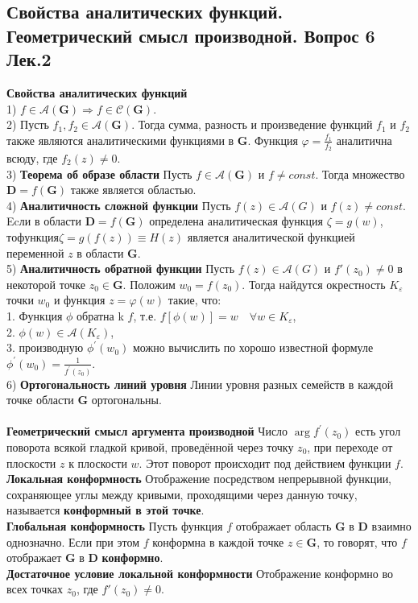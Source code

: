 \documentclass{article}
\begin{document}
\subsection{Свойства аналитических функций. Геометрический смысл производной. Вопрос 6 Лек.2}
	\textbf{Свойства аналитических функций}\\
	1) $ f \in \mathcal{A}(\mathbf{G}) \Rightarrow f \in \mathcal{C}(\mathbf{G})$.\\
	2) Пусть $ f_{1}, f_{2} \in \mathcal{A}(\mathbf{G}) $. Тогда сумма, разность и произведение функций $ f_{1} $ и $ f_{2} $ также являются аналитическими функциями в $\mathbf{G}$. Функция $\varphi=\frac{f_{1}}{f_{2}}$ аналитична всюду, где $ f_{2}(z) \neq 0$.\\
	3) \textbf{Теорема об образе области} Пусть $ f \in \mathcal{A}(\mathbf{G})$ и $f\ne const$. Тогда множество $\mathbf{D}=f(\mathbf{G})$ также является областью.\\
	4) \textbf{Аналитичность сложной функции} Пусть $ f(z) \in \mathcal{A}(  G  ) $ и $f(z) \neq  const$. Ecли в области $ \mathbf{D}=f(\mathbf{G}) $ определена аналитическая функция $ \zeta=g(w)$, $ то функция  \zeta=g(f(z)) \equiv H(z) $ является аналитической функцией переменной $z$ в области $\mathbf{G}$.\\
	5) \textbf{Аналитичность обратной функции} Пусть $ f(z) \in \mathcal{A}(  G  ) $ и $f'({z}_{0}) \neq  0$ в некоторой точке ${z}_{0}\in \mathbf{G}$. Положим $ w_{0}=f\left(z_{0}\right) $. Тогда найдутся окрестность $ K_{\varepsilon} $ точки $ w_{0} $ и функция $ z=\varphi(w) $ такие, что:\\
	1. Функция $ \phi $ обратна k $f$, т.е. $f[\phi(w)]=w \quad \forall w \in K_{\varepsilon}$,\\
	2. $\phi(w) \in \mathcal{A}\left(K_{\varepsilon}\right)$,\\ 
	3. производную $ \phi^{\prime}\left(w_{0}\right) $ можно вычислить по хорошо известной формуле $\phi^{\prime}\left(w_{0}\right)=\frac{1}{f^{\prime}\left(z_{0}\right)}$.\\
	6) \textbf{Ортогональность линий уровня} Линии уровня разных семейств в каждой точке области $\mathbf{G}$ ортогональны.\\
	\\
	\textbf{Геометрический смысл аргумента производной} Число $\arg  f^{\prime}\left(z_{0}\right) $ есть угол поворота всякой гладкой кривой, проведённой через точку $ z_{0}$,  при переходе от плоскости $ z $ к плоскости $ w $.  Этот поворот происходит под действием функции $ f $.
	\\
	\textbf{Локальная конформность} Отображение посредством непрерывной функции, сохраняющее углы между кривыми, проходящими через данную точку, называется \textbf{конформный в этой точке}.\\
	\textbf{Глобальная конформность} Пусть функция $f$ отображает область $\mathbf{G}$ в $\mathbf{D}$ взаимно однозначно. Если при этом $f$ конформна в каждой точке $z\in \mathbf{G}$, то говорят, что $f$ отображает $\mathbf{G}$ в $\mathbf{D}$ \textbf{конформно}.\\
	\textbf{Достаточное условие локальной конформности} Отображение конформно во всех точках ${z}_{0}$, где $f'({z}_{0})\ne 0$.\\
\end{document}
